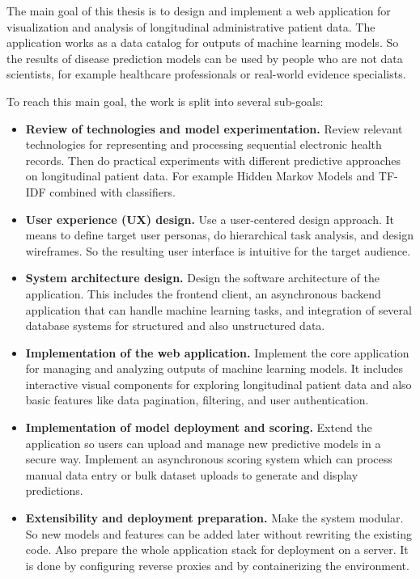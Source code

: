 The main goal of this thesis is to design and implement a web application for visualization and analysis of longitudinal administrative patient data. The application works as a data catalog for outputs of machine learning models. So the results of disease prediction models can be used by people who are not data scientists, for example healthcare professionals or real-world evidence specialists.

To reach this main goal, the work is split into several sub-goals:

\begin{itemize}
    \item \textbf{Review of technologies and model experimentation.} Review relevant technologies for representing and processing sequential electronic health records. Then do practical experiments with different predictive approaches on longitudinal patient data. For example Hidden Markov Models and TF-IDF combined with classifiers.

    \item \textbf{User experience (UX) design.} Use a user-centered design approach. It means to define target user personas, do hierarchical task analysis, and design wireframes. So the resulting user interface is intuitive for the target audience.

    \item \textbf{System architecture design.} Design the software architecture of the application. This includes the frontend client, an asynchronous backend application that can handle machine learning tasks, and integration of several database systems for structured and also unstructured data.

    \item \textbf{Implementation of the web application.} Implement the core application for managing and analyzing outputs of machine learning models. It includes interactive visual components for exploring longitudinal patient data and also basic features like data pagination, filtering, and user authentication.

    \item \textbf{Implementation of model deployment and scoring.} Extend the application so users can upload and manage new predictive models in a secure way. Implement an asynchronous scoring system which can process manual data entry or bulk dataset uploads to generate and display predictions.

    \item \textbf{Extensibility and deployment preparation.} Make the system modular. So new models and features can be added later without rewriting the existing code. Also prepare the whole application stack for deployment on a server. It is done by configuring reverse proxies and by containerizing the environment.
\end{itemize}